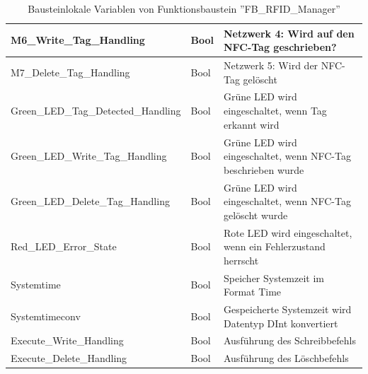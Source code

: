 \begin{table}[h!]
\begin{tabular}{|l|p{1.7cm}|p{5.6cm}|}
		M6\_Write\_Tag\_Handling & Bool & Netzwerk 4: Wird auf den NFC-Tag geschrieben? \\ \hline
		M7\_Delete\_Tag\_Handling & Bool & Netzwerk 5: Wird der NFC-Tag gelöscht \\ \hline
		Green\_LED\_Tag\_Detected\_Handling & Bool & Grüne LED wird eingeschaltet, wenn Tag erkannt wird \\ \hline
		Green\_LED\_Write\_Tag\_Handling & Bool & Grüne LED wird eingeschaltet, wenn NFC-Tag beschrieben wurde \\ \hline
		Green\_LED\_Delete\_Tag\_Handling & Bool & Grüne LED wird eingeschaltet, wenn NFC-Tag gelöscht wurde \\ \hline
		Red\_LED\_Error\_State & Bool & Rote LED wird eingeschaltet, wenn ein Fehlerzustand herrscht \\ \hline
		Systemtime & Bool & Speicher Systemzeit im Format Time \\ \hline
		Systemtimeconv & Bool & Gespeicherte Systemzeit wird Datentyp DInt konvertiert \\ \hline
		Execute\_Write\_Handling & Bool & Ausführung des Schreibbefehls \\ \hline
		Execute\_Delete\_Handling & Bool & Ausführung des Löschbefehls \\ \hline
	\end{tabular}
	\caption{Bausteinlokale Variablen von Funktionsbaustein ''FB\_RFID\_Manager''}
	\label{tab:BausteinlokaleVariablen}
\end{table}

